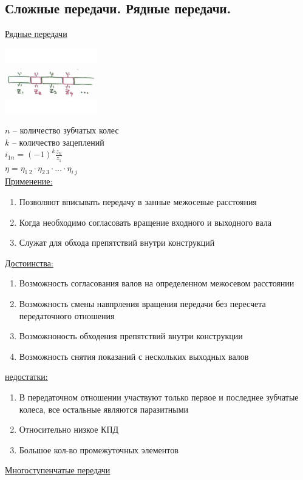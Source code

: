 \documentclass{article}
\begin{document}
\begin{multicols}{3}
\section {\tiny Сложные передачи. Рядные передачи.}

\underline{Рядные передачи}

\includegraphics[width = 0.3\textwidth]{17_1}

$n$ -- количество зубчатых колес\\
$k$ -- количество зацеплений\\
$i_{1n} = (-1)^k \frac{z_n}{z_1}$\\
$\eta = \eta_{1\:2}\cdot\eta_{2\:3}\cdot\dots\cdot\eta_{i\:j}$\\
\underline{Применение:}
\begin{enumerate}
	\item Позволяют вписывать передачу в занные межосевые расстояния
	\item Когда необходимо согласовать вращение входного и выходного вала
	\item Служат для обхода препятствий внутри конструкций
\end{enumerate}
\underline{Достоинства:} 
\begin{enumerate}
	\item Возможность согласования валов на определенном межосевом расстоянии
	\item Возможность смены навпрления вращения передачи без пересчета передаточного отношения
	\item Возможноность обходения препятствий внутри конструкции
	\item Возможность снятия показаний с нескольких выходных валов
\end{enumerate}
\underline{недостатки:} 
\begin{enumerate}
	\item В передаточном отношении участвуют только первое и последнее зубчатые колеса, все остальные являются паразитными
	\item Относительно низкое КПД
	\item Большое кол-во промежуточных элементов
\end{enumerate}

\underline{Многоступенчатые передачи} 


\end{multicols}
\end{document}
